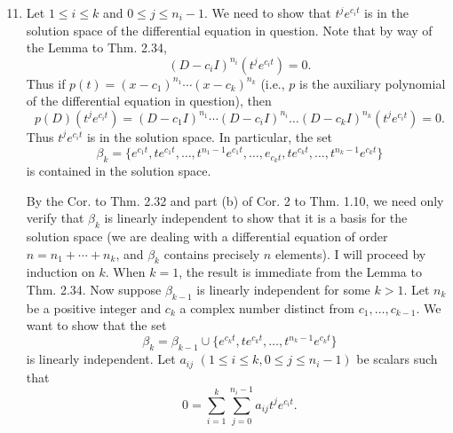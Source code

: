\documentclass[12pt]{article}
\begin{document}
\begin{enumerate}
\setcounter{enumi}{10}
\item
Let $1 \leq i \leq k$ and $0 \leq j \leq n_i-1$. We need to show that $t^je^{c_it}$ is in the solution space of the differential equation in question. Note that by way of the Lemma to Thm. 2.34,
\begin{equation*}
(D-c_iI)^{n_i}(t^je^{c_it}) = 0.
\end{equation*}
Thus if $p(t) = (x-c_1)^{n_1} \cdots (x-c_k)^{n_k}$ (i.e., $p$ is the auxiliary polynomial of the differential equation in question), then
\begin{equation*}
p(D)(t^je^{c_it}) = (D-c_1I)^{n_1} \cdots (D-c_iI)^{n_i} \dots (D-c_kI)^{n_k}(t^je^{c_it}) = 0.
\end{equation*}
Thus $t^je^{c_it}$ is in the solution space. In particular, the set
\begin{equation*}
\beta_k = \{e^{c_1t}, te^{c_1t}, \dots, t^{n_1-1}e^{c_1t}, \dots, e_{c_kt}, te^{c_kt}, \dots, t^{n_k-1}e^{c_kt}\}
\end{equation*}
is contained in the solution space.

By the Cor. to Thm. 2.32 and part (b) of Cor. 2 to Thm. 1.10, we need only verify that $\beta_k$ is linearly independent to show that it is a basis for the solution space (we are dealing with a differential equation of order $n = n_1 + \cdots + n_k$, and $\beta_k$ contains precisely $n$ elements). I will proceed by induction on $k$. When $k = 1$, the result is immediate from the Lemma to Thm. 2.34. Now suppose $\beta_{k-1}$ is linearly independent for some $k > 1$. Let $n_{k}$ be a positive integer and $c_{k}$ a complex number distinct from $c_1, \dots, c_{k-1}$. We want to show that the set
\begin{equation*}
\beta_{k} = \beta_{k-1} \cup \{e^{c_kt}, te^{c_kt}, \dots, t^{n_k-1}e^{c_kt}\}
\end{equation*}
is linearly independent. Let $a_{ij}$ $(1 \leq i \leq k, 0 \leq j \leq n_i - 1)$ be scalars such that
\begin{equation} \label{eq:1}
0 = \sum_{i=1}^k \sum_{j=0}^{n_i-1} a_{ij} t^je^{c_it}.
\end{equation}


\end{enumerate}
\end{document}
